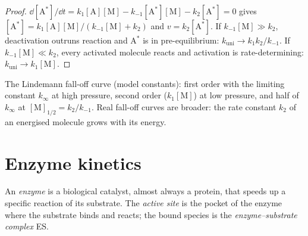 \begin{proof}
$\dd[\mathrm{A^*}]/\dd t = k_1[\mathrm A][\mathrm M] - k_{-1}[\mathrm{A^*}][\mathrm M] - k_2[\mathrm{A^*}] = 0$ gives $[\mathrm{A^*}] =
k_1[\mathrm A][\mathrm M]/(k_{-1}[\mathrm M] + k_2)$ and $v = k_2[\mathrm{A^*}]$. If $k_{-1}[\mathrm M] \gg k_2$, deactivation
outruns reaction and $\mathrm{A^*}$ is in pre-equilibrium: $k_{\mathrm{uni}} \to k_1k_2/k_{-1}$. If $k_{-1}[\mathrm M]
\ll k_2$, every activated molecule reacts and activation is rate-determining:
$k_{\mathrm{uni}} \to k_1[\mathrm M]$.
\end{proof}

\begin{omfigure}

{\small The Lindemann fall-off curve (model constants): first order with the
limiting constant $k_\infty$ at high pressure, second order ($k_1[\mathrm M]$) at low pressure,
and half of $k_\infty$ at $[\mathrm M]_{1/2} = k_2/k_{-1}$. Real fall-off curves are broader: the rate
constant $k_2$ of an energised molecule grows with its energy.}
\end{omfigure}

\section{Enzyme kinetics}

\begin{definition}\label{def:b3:complex-kinetics:enzyme}
An \emph{enzyme} is a biological catalyst, almost always a protein,
that speeds up a specific reaction of its substrate. The \emph{active
site} is the pocket of the enzyme where the substrate binds
and reacts; the bound species is the \emph{enzyme--substrate
complex} ES.
\end{definition}

